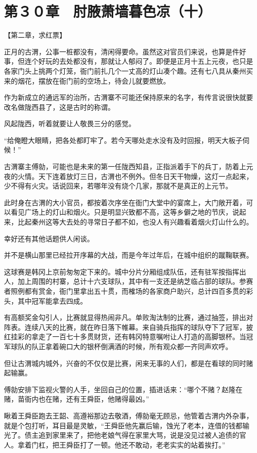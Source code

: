 \section{第３０章　肘腋萧墙暮色凉（十）}

【第二章，求红票】

正月的古渭，公事一桩都没有，清闲得要命。虽然这对官员们来说，也算是件好事，但连个好玩的去处都没有，那就让人郁闷了。即便是正月十五上元夜，也只是各家门头上挑两个灯笼，衙门前扎几个一丈高的灯山凑个趣。还有七八具从秦州买来的烟花，摆放在衙门前的空场上，待会儿就要燃放。

作为新成立的通远军的治所，古渭寨不可能还保持原来的名字，有传言说很快就要改名做陇西县了，这是古时的称谓。

风起陇西，听着就要让人敬畏三分的感觉。

“给俺瞪大眼睛，把各处都盯牢了。若今天哪处走水没有及时回报，明天大板子伺候！”

古渭寨主傅勍，可能也是未来的第一任陇西知县，正指派着手下的兵丁，防着上元夜的火情。天下连着放灯三日，古渭也不例外。但冬日天干物燥，这灯一点起来，少不得有火灾。话说回来，若哪年没有烧个几家，那就不是真正的上元节。

此时身在古渭的大小官员，都按着次序坐在衙门大堂中的宴席上，大门敞开着，可以看见广场上的灯山和烟火。只是明显兴致都不高，这等乡僻之地的节庆，说起来，比起秦州这等大去处的寻常日子都不如，也没人有兴趣看着烟火灯山什么的。

幸好还有其他话题供人闲谈。

并不是横山那里已经拉开序幕的大战，而是今年过年后，在城中组织的蹴鞠联赛。

这球赛是韩冈上京前匆匆定下来的。城中分片分厢组成队伍，还有驻军按指挥出人，加上周围的村寨，总计十六支球队，其中有一支还是纳芝临占部的球队。参赛者照例都有赏金，衙门里拿出五十贯，而榷场的各家商户助兴，总计四百多贯的彩头，其中冠军能拿去四成。

有高额奖金勾引人，比赛就显得热闹非凡。单败淘汰制的比赛，通过抽签，排出对阵表。连续八天的比赛，就在昨日落下帷幕。来自骑兵指挥的球队夺下了冠军，披红挂彩的拿走了一百七十多贯财货，还有韩冈特意嘱咐让人打造的高脚银杯。当冠军球队的队正拿着碗口大的银杯倒满酒的时候，所有观众都一齐同声欢呼。

但让古渭城内城外，兴奋的不仅仅是比赛，闲来无事的人们，都是在看球的同时赌起输赢。

傅勍安排下监视火警的人手，坐回自己的位置，插进话来：“哪个不赌？赵隆在赌，苗衙内也在赌，还有王舜臣，他赌得最凶。”

瞅着王舜臣跑去王韶、高遵裕那边去敬酒，傅勍毫无顾忌，他管着古渭内外杂事，就是个包打听，耳目最是灵敏，“王舜臣他先赢后输，蚀光了老本，连借的钱都输光了。债主追到家里来了，把他老娘气得在家里大骂，说是没见过被人追债的官人。拿着门杠，把王舜臣打了一顿。他还不敢动，老老实实的站着挨打。”

